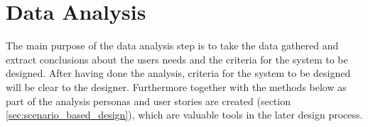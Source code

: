 \section{Data Analysis} \label{sec:1_data_analysis}
The main purpose of the data analysis step is to take the data gathered and extract conclusions about the users needs and the criteria for the system to be designed. After having done the analysis, criteria for the system to be designed will be clear to the designer. Furthermore together with the methods below as part of the analysis personas and user stories are created (section \ref{sec:scenario_based_design}), which are valuable tools in the later design process.





